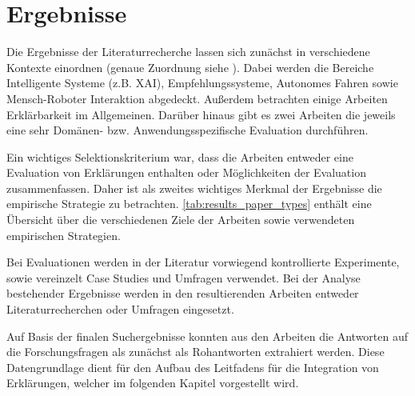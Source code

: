 \newpage

\section{Ergebnisse}

Die Ergebnisse der Literaturrecherche lassen sich zunächst in verschiedene Kontexte einordnen (genaue Zuordnung siehe ). Dabei werden die Bereiche Intelligente Systeme (z.B. XAI), Empfehlungssysteme, Autonomes Fahren sowie Mensch-Roboter Interaktion abgedeckt. Außerdem betrachten einige Arbeiten Erklärbarkeit im Allgemeinen. Darüber hinaus gibt es zwei Arbeiten die jeweils eine sehr Domänen- bzw. Anwendungsspezifische Evaluation durchführen.

Ein wichtiges Selektionskriterium war, dass die Arbeiten entweder eine Evaluation von Erklärungen enthalten oder Möglichkeiten der Evaluation zusammenfassen. Daher ist als zweites wichtiges Merkmal der Ergebnisse die empirische Strategie zu betrachten. \autoref{tab:results_paper_types} enthält eine Übersicht über die verschiedenen Ziele der Arbeiten sowie verwendeten empirischen Strategien.

Bei Evaluationen werden in der Literatur vorwiegend kontrollierte Experimente, sowie vereinzelt Case Studies und Umfragen verwendet. Bei der Analyse bestehender Ergebnisse werden in den resultierenden Arbeiten entweder Literaturrecherchen oder Umfragen eingesetzt.

Auf Basis der finalen Suchergebnisse konnten aus den Arbeiten die Antworten auf die Forschungsfragen als zunächst als Rohantworten extrahiert werden. Diese Datengrundlage dient für den Aufbau des Leitfadens für die Integration von Erklärungen, welcher im folgenden Kapitel vorgestellt wird.

